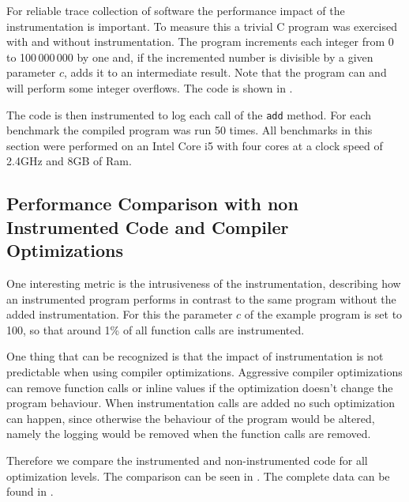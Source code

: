 For reliable trace collection of software the performance impact of the instrumentation is important.
To measure this a trivial C program was exercised with and without instrumentation.
The program increments each integer from 0 to 100\,000\,000 by one and, if the incremented number is divisible by a given parameter \(c\), adds it to an intermediate result.
Note that the program  can and will perform some integer overflows.
The code is shown in .

The code is then instrumented to log each call of the \lstinline{add} method.
For each benchmark the compiled program was run 50 times.
All benchmarks in this section were performed on an Intel Core i5 with four cores at a clock speed of 2.4GHz and 8GB of Ram.

\begin{figure}[!hb]

\end{figure}


\subsection{Performance Comparison with non Instrumented Code and Compiler Optimizations}
\label{sec:evaluation:instrumentation_benchmark:instr_vs_non_inst}

One interesting metric is the intrusiveness of the instrumentation, describing how an instrumented program performs in contrast to the same program without the added instrumentation.
For this the parameter \(c\) of the example program is set to 100, so that around 1\% of all function calls are instrumented.

One thing that can be recognized is that the impact of instrumentation is not predictable when using compiler optimizations.
Aggressive compiler optimizations can remove function calls or inline values if the optimization doesn't change the program behaviour.
When instrumentation calls are added no such optimization can happen, since otherwise the behaviour of the program would be altered, namely the logging would be removed when the function calls are removed.

Therefore we compare the instrumented and non-instrumented code for all optimization levels.
The comparison can be seen in .
The complete data can be found in .

